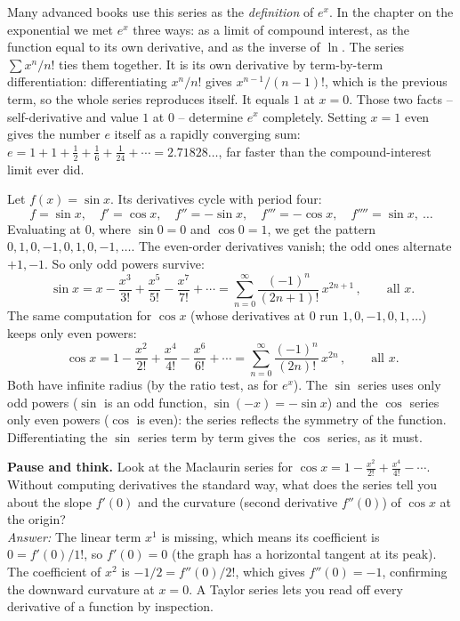 \begin{happeningbox}
Many advanced books use this series as the \emph{definition} of $e^x$. In the chapter on the exponential we met $e^x$ three ways: as a limit of compound interest, as the function equal to its own derivative, and as the inverse of $\ln$. The series $\sum x^n/n!$ ties them together. It is its own derivative by term-by-term differentiation: differentiating $x^n/n!$ gives $x^{n-1}/(n-1)!$, which is the previous term, so the whole series reproduces itself. It equals $1$ at $x=0$. Those two facts -- self-derivative and value $1$ at $0$ -- determine $e^x$ completely. Setting $x=1$ even gives the number $e$ itself as a rapidly converging sum: $e = 1 + 1 + \tfrac12 + \tfrac16 + \tfrac1{24} + \cdots = 2.71828\ldots$, far faster than the compound-interest limit ever did.
\end{happeningbox}

\begin{example}
\label{ch30:ex-sin-cos}
Let $f(x) = \sin x$. Its derivatives cycle with period four:
\[
  f = \sin x,\quad f' = \cos x,\quad f'' = -\sin x,\quad f''' = -\cos x,\quad f'''' = \sin x,\ \dots
\]
Evaluating at $0$, where $\sin 0 = 0$ and $\cos 0 = 1$, we get the pattern $0, 1, 0, -1, 0, 1, 0, -1, \dots$. The even-order derivatives vanish; the odd ones alternate $+1, -1$. So only odd powers survive:
\[
  \boxed{\,\sin x = x - \frac{x^3}{3!} + \frac{x^5}{5!} - \frac{x^7}{7!} + \cdots
  = \sum_{n=0}^{\infty}\frac{(-1)^n}{(2n+1)!}\,x^{2n+1}\,}, \qquad \text{all } x.
\]
The same computation for $\cos x$ (whose derivatives at $0$ run $1, 0, -1, 0, 1, \dots$) keeps only even powers:
\[
  \boxed{\,\cos x = 1 - \frac{x^2}{2!} + \frac{x^4}{4!} - \frac{x^6}{6!} + \cdots
  = \sum_{n=0}^{\infty}\frac{(-1)^n}{(2n)!}\,x^{2n}\,}, \qquad \text{all } x.
\]
Both have infinite radius (by the ratio test, as for $e^x$). The $\sin$ series uses only odd powers ($\sin$ is an odd function, $\sin(-x) = -\sin x$) and the $\cos$ series only even powers ($\cos$ is even): the series reflects the symmetry of the function. Differentiating the $\sin$ series term by term gives the $\cos$ series, as it must.
\end{example}

\begin{recoverybox}
\textbf{Pause and think.} Look at the Maclaurin series for $\cos x = 1 - \frac{x^2}{2!} + \frac{x^4}{4!} - \cdots$.
Without computing derivatives the standard way, what does the series tell you about the slope $f'(0)$ and the curvature (second derivative $f''(0)$) of $\cos x$ at the origin?
\\[0.4em]
\emph{Answer:} The linear term $x^1$ is missing, which means its coefficient is $0 = f'(0)/1!$, so $f'(0) = 0$ (the graph has a horizontal tangent at its peak). The coefficient of $x^2$ is $-1/2 = f''(0)/2!$, which gives $f''(0) = -1$, confirming the downward curvature at $x=0$. A Taylor series lets you read off every derivative of a function by inspection.
\end{recoverybox}

